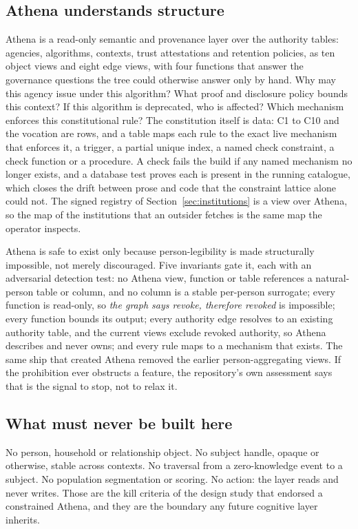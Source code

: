 \subsection{Athena understands structure}

Athena is a read-only semantic and provenance layer over the authority tables: agencies,
algorithms, contexts, trust attestations and retention policies, as ten object views and eight edge
views, with four functions that answer the governance questions the tree could otherwise answer only
by hand. Why may this agency issue under this algorithm? What proof and disclosure policy bounds
this context? If this algorithm is deprecated, who is affected? Which mechanism enforces this
constitutional rule? The constitution itself is data: C1 to C10 and the vocation are rows, and a
table maps each rule to the exact live mechanism that enforces it, a trigger, a partial unique index,
a named check constraint, a check function or a procedure. A check fails the build if any named
mechanism no longer exists, and a database test proves each is present in the running catalogue,
which closes the drift between prose and code that the constraint lattice alone could not. The
signed registry of Section~\ref{sec:institutions} is a view over Athena, so the map of the
institutions that an outsider fetches is the same map the operator inspects. \sImpl

Athena is safe to exist only because person-legibility is made structurally impossible, not merely
discouraged. Five invariants gate it, each with an adversarial detection test: no Athena view,
function or table references a natural-person table or column, and no column is a stable per-person
surrogate; every function is read-only, so \emph{the graph says revoke, therefore revoked} is
impossible; every function bounds its output; every authority edge resolves to an existing authority
table, and the current views exclude revoked authority, so Athena describes and never owns; and every
rule maps to a mechanism that exists. The same ship that created Athena removed the earlier
person-aggregating views. If the prohibition ever obstructs a feature, the repository's own
assessment says that is the signal to stop, not to relax it. \sImpl

\subsection{What must never be built here}

No person, household or relationship object. No subject handle, opaque or otherwise, stable across
contexts. No traversal from a zero-knowledge event to a subject. No population segmentation or
scoring. No action: the layer reads and never writes. Those are the kill criteria of the design
study that endorsed a constrained Athena, and they are the boundary any future cognitive layer
inherits.

